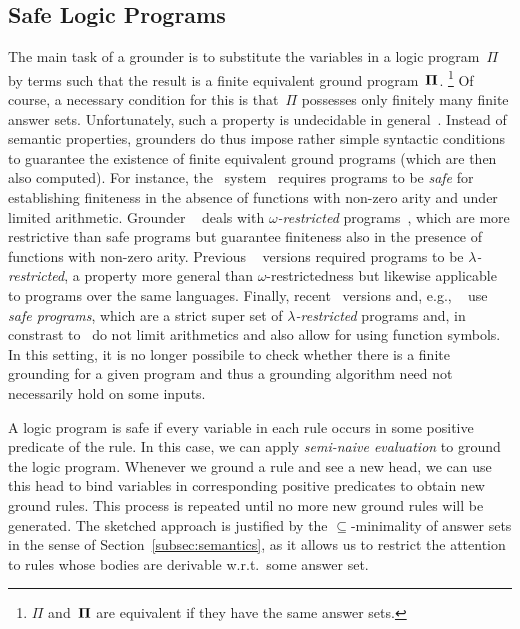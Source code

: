 \begin{newstuff}
\subsection{Safe Logic Programs}\label{subsec:safe}

The main task of a grounder is to substitute the variables in a logic program~$\Pi$
by terms such that the result is a finite equivalent ground program~$\mathbf{\Pi}$.%
\footnote{$\Pi$ and~$\mathbf{\Pi}$ are equivalent if they have the same answer sets.}
Of course, a necessary condition for this is that~$\Pi$ possesses
only finitely many finite answer sets.
Unfortunately, such a property is undecidable in general~\cite{daeigovo01a}.
Instead of semantic properties, grounders do thus impose rather simple syntactic
conditions to guarantee the existence of finite equivalent ground programs
(which are then also computed).
For instance, the \dlv\ system~\cite{dlv03a} requires programs to be \emph{safe} for
establishing finiteness in the absence of functions with non-zero arity and under
limited arithmetic.
Grounder \lparse~\cite{lparseManual} deals with \emph{$\omega$-restricted}
programs~\cite{syrjanen01a}, which are more restrictive than safe programs
but guarantee finiteness also in the presence of functions with non-zero arity.
Previous \gringo~\cite{gescth07a} versions required programs to be \emph{$\lambda$-restricted},
a property more general than $\omega$-restrictedness but likewise applicable
to programs over the same languages.
Finally, recent \gringo\ versions and, e.g., \dlvcomplex~ use \emph{safe programs}, 
which are a strict super set of \emph{$\lambda$-restricted} programs 
and, in constrast to \dlv\, do not limit arithmetics and also allow for using function symbols.
In this setting, it is no longer possibile to check
whether there is a finite grounding for a given program and 
thus a grounding algorithm need not necessarily hold on some inputs.

A logic program is safe if every variable in each rule occurs in some positive predicate of the rule.
In this case, we can apply \emph{semi-naive evaluation}  to ground the logic program.
Whenever we ground a rule and see a new head, we can use this head to bind variables
in corresponding positive predicates to obtain new ground rules.
This process is repeated until no more new ground rules will be generated.
The sketched approach is justified by the $\subseteq$-minimality of answer sets
in the sense of Section~\ref{subsec:semantics},
as it allows us to restrict the attention to rules whose bodies are derivable w.r.t.\
some answer set.


\end{newstuff}
